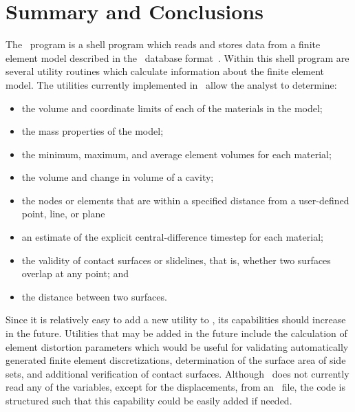 \chapter{Summary and Conclusions}\label{c:conclude}

The \numbers\ program is a shell program which reads and stores data
from a finite element model described in the \exo\ database
format~\cite{EXODUS}. Within this shell program are several utility
routines which calculate information about the finite element model.
The utilities currently implemented in \numbers\ allow the analyst to
determine: 
\begin{itemize}
\item the volume and coordinate limits of each of the materials in the model;
\item the mass properties of the model; 
\item the minimum, maximum, and average element volumes for each material; 
\item the volume and change in volume of a cavity; 
\item the nodes or elements that are within a specified distance from a
user-defined point, line, or plane 
\item an estimate of the explicit central-difference timestep for each 
material; 
\item the validity of contact surfaces or slidelines, that is, whether
two surfaces overlap at any point; and
\item the distance between two surfaces.
\end{itemize}

Since it is relatively easy to add a new utility to \numbers, its
capabilities should increase in the future.  Utilities that may be added
in the future include the calculation of element distortion parameters
which would be useful for validating automatically generated finite
element discretizations, determination of the surface area of side sets,
and additional verification of contact surfaces. Although \numbers\ does
not currently read any of the variables, except for the displacements,
from an \exo\ file, the code is structured such that this capability
could be easily added if needed.  

